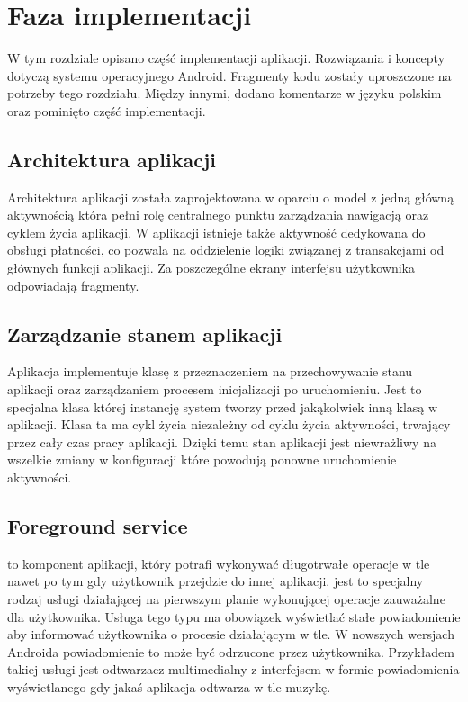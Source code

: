 \section{Faza implementacji}
W tym rozdziale opisano część implementacji aplikacji. Rozwiązania i koncepty dotyczą systemu operacyjnego Android. Fragmenty kodu zostały uproszczone na potrzeby tego rozdziału. Między innymi, dodano komentarze w języku polskim oraz pominięto część implementacji.

\subsection{Architektura aplikacji}
Architektura aplikacji została zaprojektowana w oparciu o model z jedną główną aktywnością która pełni rolę centralnego punktu zarządzania nawigacją oraz cyklem życia aplikacji. W aplikacji istnieje także aktywność dedykowana do obsługi płatności, co pozwala na oddzielenie logiki związanej z transakcjami od głównych funkcji aplikacji. Za poszczególne ekrany interfejsu użytkownika odpowiadają fragmenty.

\subsection{Zarządzanie stanem aplikacji}
Aplikacja implementuje klasę  z przeznaczeniem na przechowywanie stanu aplikacji oraz zarządzaniem procesem inicjalizacji po uruchomieniu. Jest to specjalna klasa której instancję system tworzy przed jakąkolwiek inną klasą w aplikacji. Klasa ta ma cykl życia niezależny od cyklu życia aktywności, trwający przez cały czas pracy aplikacji. Dzięki temu stan aplikacji jest niewrażliwy na wszelkie zmiany w konfiguracji które powodują ponowne uruchomienie aktywności.

\newpage

\subsection{Foreground service}
 to komponent aplikacji, który potrafi wykonywać długotrwałe operacje w tle nawet po tym gdy użytkownik przejdzie do innej aplikacji.  jest to specjalny rodzaj usługi działającej na pierwszym planie wykonującej operacje zauważalne dla użytkownika. Usługa tego typu ma obowiązek wyświetlać stałe powiadomienie aby informować użytkownika o procesie działającym w tle. W nowszych wersjach Androida powiadomienie to może być odrzucone przez użytkownika. Przykładem takiej usługi jest odtwarzacz multimedialny z interfejsem w formie powiadomienia wyświetlanego gdy jakaś aplikacja odtwarza w tle muzykę.\\

